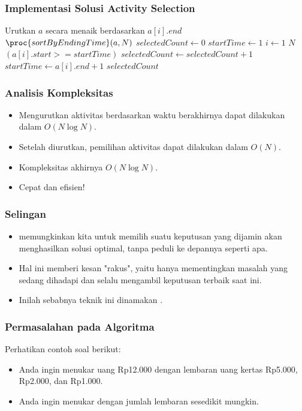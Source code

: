 \begin{frame} [fragile]
  \frametitle{Implementasi Solusi Activity Selection}
  \begin{codebox}
    \li \Comment Urutkan $a$ secara menaik berdasarkan $a[i].end$
    \li $\proc{sortByEndingTime}(a, N)$
    \zi
    \li $selectedCount \gets 0$
    \li $startTime \gets 1$
    \li \For $i \gets 1$ \To $N$ \Do
    \li   \If $(a[i].start >= startTime)$ \Then
    \li     $selectedCount \gets selectedCount + 1$
    \li     $startTime \gets a[i].end + 1$
          \End
        \End
    \li \Return $selectedCount$
  \end{codebox}
\end{frame}

\begin{frame}
  \frametitle{Analisis Kompleksitas}
  \begin{itemize}
    \item Mengurutkan aktivitas berdasarkan waktu berakhirnya dapat dilakukan dalam $O(N \log{N})$.
    \item Setelah diurutkan, pemilihan aktivitas dapat dilakukan dalam $O(N)$.
    \item Kompleksitas akhirnya $O(N \log{N})$.
    \item Cepat dan efisien!
  \end{itemize}
\end{frame}

\begin{frame}
  \frametitle{Selingan}
  \begin{itemize}
    \item \fGreedyChoice memungkinkan kita untuk memilih suatu keputusan yang dijamin akan menghasilkan solusi optimal, tanpa peduli ke depannya seperti apa.
    \item Hal ini memberi kesan "rakus", yaitu hanya mementingkan masalah yang sedang dihadapi dan selalu mengambil keputusan terbaik saat ini.
    \item Inilah sebabnya teknik ini dinamakan \fgreedy.
  \end{itemize}
\end{frame}

\begin{frame}
  \frametitle{Permasalahan pada Algoritma \fGreedy}
  Perhatikan contoh soal berikut:
  \begin{itemize}
    \item Anda ingin menukar uang Rp12.000 dengan lembaran uang kertas Rp5.000, Rp2.000, dan Rp1.000.
    \item Anda ingin menukar dengan jumlah lembaran sesedikit mungkin.
  \end{itemize}
\end{frame}

